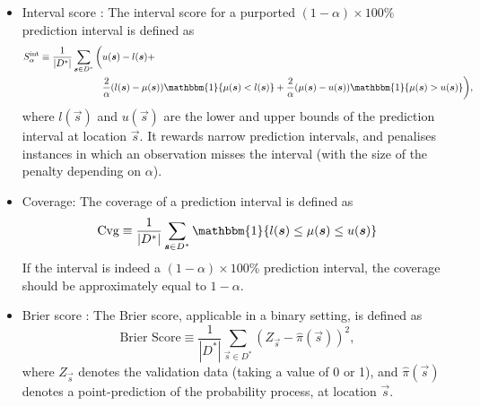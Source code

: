 \documentclass[12pt,a4paper]{article}
\begin{document}
\begin{appendices}
\begin{itemize}
    \item Interval score \citep[sec.~6.2]{Gneiting_2007_scoring_rules}: The interval score for a purported $(1-\alpha)\times 100$\% prediction interval is defined as
    \begin{align*}
    S_{\alpha}^{\text{int}} 
    \equiv 
    \frac{1}{|D^*|}\sum_{\vec{s} \in D^*}
    \bigg(
    & u(\vec{s}) - l(\vec{s}) 
    + \\
    &\frac{2}{\alpha}(l(\vec{s})-\mu(\vec{s})) \mathbbm{1}\{\mu(\vec{s}) < l(\vec{s})\}
    + \frac{2}{\alpha}(\mu(\vec{s})- u(\vec{s})) \mathbbm{1}\{\mu(\vec{s}) > u(\vec{s})\} \bigg),
    \end{align*}
    where $l(\vec{s})$ and $u(\vec{s})$ are the lower and upper bounds of the prediction interval at location $\vec{s}$.
    It rewards narrow prediction intervals, and penalises instances in which an observation misses the interval (with the size of the penalty depending on $\alpha$). 
    \item Coverage: The coverage of a prediction interval is defined as 
    \begin{equation*}
    \text{Cvg} \equiv \frac{1}{|D^*|}\sum_{\vec{s} \in D^*} \mathbbm{1}\{l(\vec{s}) \leq \mu(\vec{s})  \leq u(\vec{s})\}
    \end{equation*}
    If the interval is indeed a $(1-\alpha)\times 100$\% prediction interval, the coverage should be approximately equal to $1-\alpha$.
    \item Brier score \citep[sec 3.]{Gneiting_2007_scoring_rules}: The Brier score, applicable in a binary setting, is defined as 
    \[
    \text{Brier Score} \equiv
    \frac{1}{|D^*|}\sum_{\vec{s} \in D^*} (Z_{\vec{s}} - \hat{\pi}(\vec{s}))^2,
    \]
    where $Z_{\vec{s}}$ denotes the validation data (taking a value of 0 or 1), and $\hat{\pi}(\vec{s})$ denotes a point-prediction of the probability process, at location $\vec{s}$.

\end{itemize}
\end{appendices}
\end{document}
